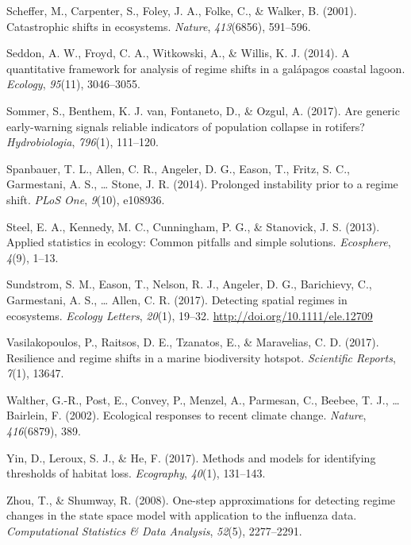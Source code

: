 \documentclass[12pt,twoside,openany]{reedthesis}
\begin{document}
\hypertarget{ref-scheffer_catastrophic_2001}{}
Scheffer, M., Carpenter, S., Foley, J. A., Folke, C., \& Walker, B.
(2001). Catastrophic shifts in ecosystems. \emph{Nature},
\emph{413}(6856), 591--596.

\hypertarget{ref-seddon2014quantitative}{}
Seddon, A. W., Froyd, C. A., Witkowski, A., \& Willis, K. J. (2014). A
quantitative framework for analysis of regime shifts in a galápagos
coastal lagoon. \emph{Ecology}, \emph{95}(11), 3046--3055.

\hypertarget{ref-sommer2017generic}{}
Sommer, S., Benthem, K. J. van, Fontaneto, D., \& Ozgul, A. (2017). Are
generic early-warning signals reliable indicators of population collapse
in rotifers? \emph{Hydrobiologia}, \emph{796}(1), 111--120.

\hypertarget{ref-spanbauer_prolonged_2014}{}
Spanbauer, T. L., Allen, C. R., Angeler, D. G., Eason, T., Fritz, S. C.,
Garmestani, A. S., \ldots{} Stone, J. R. (2014). Prolonged instability
prior to a regime shift. \emph{PLoS One}, \emph{9}(10), e108936.

\hypertarget{ref-steel2013applied}{}
Steel, E. A., Kennedy, M. C., Cunningham, P. G., \& Stanovick, J. S.
(2013). Applied statistics in ecology: Common pitfalls and simple
solutions. \emph{Ecosphere}, \emph{4}(9), 1--13.

\hypertarget{ref-sundstrom2017detecting}{}
Sundstrom, S. M., Eason, T., Nelson, R. J., Angeler, D. G., Barichievy,
C., Garmestani, A. S., \ldots{} Allen, C. R. (2017). Detecting spatial
regimes in ecosystems. \emph{Ecology Letters}, \emph{20}(1), 19--32.
\url{http://doi.org/10.1111/ele.12709}

\hypertarget{ref-vasilakopoulos2017resilience}{}
Vasilakopoulos, P., Raitsos, D. E., Tzanatos, E., \& Maravelias, C. D.
(2017). Resilience and regime shifts in a marine biodiversity hotspot.
\emph{Scientific Reports}, \emph{7}(1), 13647.

\hypertarget{ref-walther_ecological_2002}{}
Walther, G.-R., Post, E., Convey, P., Menzel, A., Parmesan, C., Beebee,
T. J., \ldots{} Bairlein, F. (2002). Ecological responses to recent
climate change. \emph{Nature}, \emph{416}(6879), 389.

\hypertarget{ref-yin2017methods}{}
Yin, D., Leroux, S. J., \& He, F. (2017). Methods and models for
identifying thresholds of habitat loss. \emph{Ecography}, \emph{40}(1),
131--143.

\hypertarget{ref-zhou2008one}{}
Zhou, T., \& Shumway, R. (2008). One-step approximations for detecting
regime changes in the state space model with application to the
influenza data. \emph{Computational Statistics \& Data Analysis},
\emph{52}(5), 2277--2291.
\end{document}
